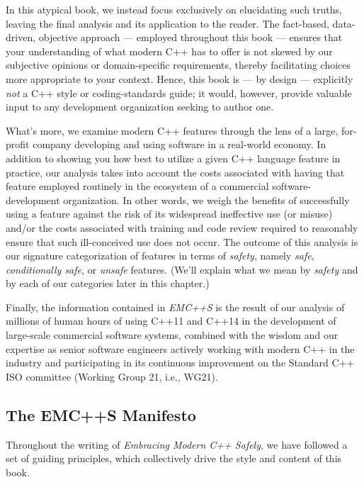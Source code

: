 In this atypical book, we instead focus exclusively on elucidating such truths, leaving the final analysis and its application to the reader. The fact-based, data-driven, objective approach --- employed throughout this book --- ensures that your understanding of what modern C++ has to offer is not skewed by our subjective opinions or domain-specific requirements, thereby facilitating choices more appropriate to your context. Hence, this book is --- by design --- explicitly \textit{not} a C++ style or coding-standards guide; it would, however, provide valuable input to any development organization seeking to author one.

What's more, we examine modern C++ features through the lens of a large, for-profit company developing and using software in a real-world economy. In addition to showing you how best to utilize a given C++ language feature in practice, our analysis takes into account the costs associated with having that feature employed routinely in the ecosystem of a commercial software-development organization. In other words, we weigh the benefits of successfully using a feature against the risk of its widespread ineffective use (or misuse) and/or the costs associated with training and code review required to reasonably ensure that such ill-conceived use does not occur. The outcome of this analysis is our signature categorization of features in terms of \textit{safety}, namely \textit{safe}, \textit{conditionally safe}, or \textit{unsafe} features. (We'll explain what we mean by \textit{safety} and by each of our categories later in this chapter.)

Finally, the information contained in \textit{EMC++S} is the result of our analysis of millions of human hours of using C++11 and C++14 in the development of large-scale commercial software systems, combined with the wisdom and our expertise as senior software engineers actively working with modern C++ in the industry and participating in its continuous improvement on the Standard C++ ISO committee (Working Group 21, i.e., WG21).

\subsection[The {\sffamily\itshape EMC++S} Manifesto]{The {\sfbsubsecitalRomeo EMC++S} Manifesto}

Throughout the writing of \textit{Embracing Modern C++ Safely}, we have followed a set of guiding principles, which collectively drive the style and content of this book.

